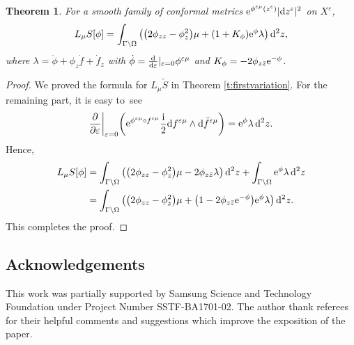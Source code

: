 \documentclass[10pt,a4paper]{amsart}
\numberwithin{equation}{section}
\newtheorem{Theorem}{Theorem}[section]
\newcommand{\vep}{\varepsilon}
\begin{document}
\begin{Theorem}
For a smooth family of conformal metrics ${\rm e}^{\phi^{\vep\mu}(z^\vep)}|{\rm d}z^\vep|^2$ on $X^\vep$,
\begin{gather*}
L_{\mu} {S}[\phi]=\int_{\Gamma\backslash \Omega} \big(\big(2\phi_{zz}-\phi^2_z\big)\mu +(1+K_\phi) {\rm e}^{\phi} \lambda \big)\, {\rm d}^2z,
\end{gather*}
where $\lambda=\dot{\phi}+\phi_z \dot{f} +\dot{f}_z$ with $\dot{\phi}=\frac{\rm d}{{\rm d}\vep}|_{\vep=0} \phi^{\vep\mu}$ and $K_\phi=-2\phi_{z\bar{z}} {\rm e}^{-\phi}$.
\end{Theorem}

\begin{proof}
We proved the formula for $L_{\mu} \check{S}$ in Theorem \ref{t:firstvariation}. For the remaining part,
it is easy to~see
\begin{gather*}
\frac{\partial}{\partial\vep}\bigg|_{\vep=0} \bigg( {\rm e}^{\phi^{\vep\mu}\circ f^{\vep\mu}} \frac{\rm i}{2} {\rm d}f^{\vep\mu}\wedge {\rm d}\bar{f}^{\vep\mu} \bigg) = {\rm e}^\phi \lambda\, {\rm d}^2z.
\end{gather*}
Hence,
\begin{align*}
L_\mu S[\phi] &=\int_{\Gamma\backslash \Omega} \big( \big(2\phi_{zz}-\phi^2_z\big)\mu -2\phi_{z\bar{z}} \lambda \big)\, {\rm d}^2z + \int_{\Gamma\backslash \Omega} {\rm e}^\phi \lambda\, {\rm d}^2z
\\
&= \int_{\Gamma\backslash \Omega} \big(\big(2\phi_{zz}-\phi^2_z\big)\mu +\big(1 -2\phi_{z\bar{z}} {\rm e}^{-\phi} \big) {\rm e}^{\phi}\lambda \big)\, {\rm d}^2z.
\end{align*}
This completes the proof.
\end{proof}

\subsection*{Acknowledgements}
This work was partially supported by Samsung Science and Technology Foundation under Project Number SSTF-BA1701-02.
The author thank referees for their helpful comments and suggestions which improve the exposition of the paper.

\end{document}
